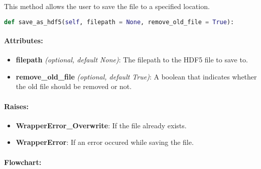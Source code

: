 This method allows the user to save the file to a specified location.

\begin{lstlisting}[language=Python]
def save_as_hdf5(self, filepath = None, remove_old_file = True):
\end{lstlisting}

\paragraph{Attributes:}

\begin{itemize}
    \item \textbf{filepath} \textit{(optional, default None)}: The filepath to the HDF5 file to save to.
    \item \textbf{remove\_old\_file} \textit{(optional, default True)}: A boolean that indicates whether the old file should be removed or not.
\end{itemize}

\paragraph{Raises:}
\begin{itemize}
    \item \textbf{WrapperError\_Overwrite}: If the file already exists.
    \item \textbf{WrapperError}: If an error occured while saving the file.
\end{itemize}


\paragraph{Flowchart:}


